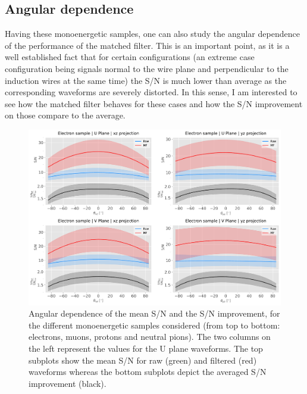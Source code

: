 \subsection{Angular dependence}
\label{subsec:2.5.1}

Having these monoenergetic samples, one can also study the angular dependence of the performance of the matched filter. This is an important point, as it is a well established fact that for certain configurations (an extreme case configuration being signals normal to the wire plane and perpendicular to the induction wires at the same time) the S/N is much lower than average as the corresponding waveforms are severely distorted. In this sense, I am interested to see how the matched filter behaves for these cases and how the S/N improvement on those compare to the average.

\begin{figure}[t]
	\centering
	\includegraphics[width=0.9\linewidth]{Images/Matched_Filter/larsoft_electron_angular.pdf}
	\caption{Angular dependence of the mean S/N and the S/N improvement, for the different monoenergetic samples considered (from top to bottom: electrons, muons, protons and neutral pions). The two columns on the left represent the values for the U plane waveforms. The top subplots show the mean S/N for raw (green) and filtered (red) waveforms whereas the bottom subplots depict the averaged S/N improvement (black).}
	\label{fig:angular_electron}
\end{figure}

